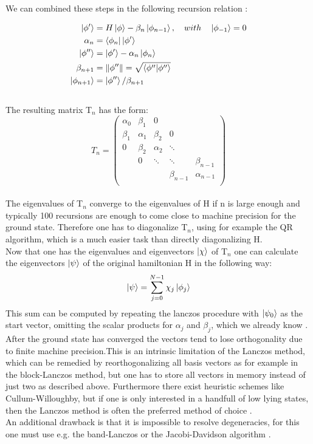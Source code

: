 \documentclass{article}
\begin{document}
We can combined these steps in the following recursion relation \cite{Fehske}:

\begin{align*}
\ket{\phi'}&=H\ket{\phi} - \beta_n\ket{\phi_{n-1}}, \quad with \quad \ket{\phi_{-1}} = 0\\
\alpha_n &= \bra{\phi_n} \ket{\phi'}\\
\ket{\phi''} &= \ket{\phi'} - \alpha_n\ket{\phi_n}\\
\beta_{n+1} &= \|\phi''\| = \sqrt{\braket{\phi''|\phi''}}\\
\ket{\phi_{n+1}} &= \ket{\phi''}/\beta_{n+1}
\end{align*}\\
The resulting matrix T$_n$ has the form:\\
\begin{equation*}
T_n = 
\begin{pmatrix}
\alpha_0 & \beta_1 & 0 & &\\
\beta_1 & \alpha_1 & \beta_2 & 0 &\\
0 & \beta_2 & \alpha_2 & \ddots & \\
 & 0 & \ddots & \ddots & \beta_{n-1}\\
 & & & \beta_{n-1} & \alpha_{n-1}\\
\end{pmatrix}
\end{equation*}\\
The eigenvalues of T$_n$ converge to the eigenvalues of H if n is
large enough and typically 100 recursions are enough to come close to
machine precision for the ground state. Therefore one has to
diagonalize T$_n$, using for example the QR algorithm, which is a much
easier task than directly diagonalizing H.\\
Now that one has the eigenvalues and eigenvectors $\ket{\chi}$ of
T$_n$ one can calculate the eigenvectors $\ket{\psi}$ of the original
hamiltonian H in the following way:
\begin{equation}
\label{eq:15}
\ket{\psi} = \sum\limits_{j=0}^{N-1} \chi_j \ket{\phi_j}
\end{equation}
This sum can be computed by repeating the lanczos procedure with
$\ket{\psi_0}$ as the start vector, omitting the scalar products for $\alpha_j$ and
$\beta_j$, which we already know \cite{Fehske}.\\
After the ground state has converged the vectors tend to lose
orthogonality due to finite machine precision.This is an intrinsic
limitation of the Lanczos method, which can be remedied by
reorthogonalizing all basis vectors as for example in the block-Lanczos
method, but one has to store all vectors in memory instead of just two
as described above. Furthermore there exist heuristic schemes like
Cullum-Willoughby, but if one is only interested in a handfull of low
lying states, then the Lanczos method is often the preferred method of
choice \cite{Noack}.\\
An additional drawback is that it is impossible to resolve
degeneracies, for this one must use e.g. the band-Lanczos or the
Jacobi-Davidson algorithm \cite{Fehske}.\\ 
\end{document}
